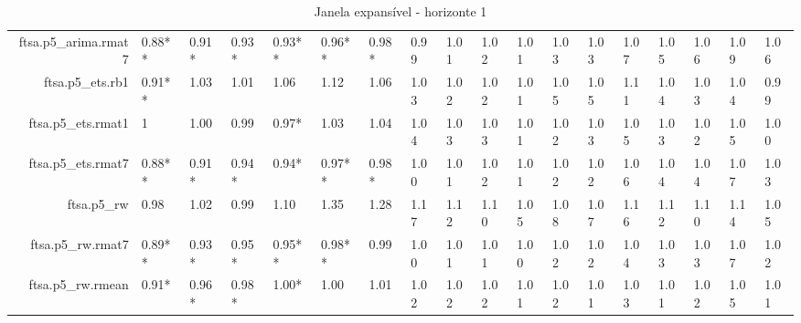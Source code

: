 \begin{table}[ht]
{\begin{tabular}{rlllllllllllllllll}
  ftsa.p5\_arima.rmat7 & 0.88** & 0.91* & 0.93* & 0.93** & 0.96** & 0.98* & 0.99 & 1.01 & 1.02 & 1.01 & 1.03 & 1.03 & 1.07 & 1.05 & 1.06 & 1.09 & 1.06 \\ 
  ftsa.p5\_ets.rb1 & 0.91** & 1.03 & 1.01 & 1.06 & 1.12 & 1.06 & 1.03 & 1.02 & 1.02 & 1.01 & 1.05 & 1.05 & 1.11 & 1.04 & 1.03 & 1.04 & 0.99 \\ 
  ftsa.p5\_ets.rmat1 & 1 & 1.00 & 0.99 & 0.97* & 1.03 & 1.04 & 1.04 & 1.03 & 1.03 & 1.01 & 1.02 & 1.03 & 1.05 & 1.03 & 1.02 & 1.05 & 1.00 \\ 
  ftsa.p5\_ets.rmat7 & 0.88** & 0.91* & 0.94* & 0.94* & 0.97** & 0.98* & 1.00 & 1.01 & 1.02 & 1.01 & 1.02 & 1.02 & 1.06 & 1.04 & 1.04 & 1.07 & 1.03 \\ 
  ftsa.p5\_rw & 0.98 & 1.02 & 0.99 & 1.10 & 1.35 & 1.28 & 1.17 & 1.12 & 1.10 & 1.05 & 1.08 & 1.07 & 1.16 & 1.12 & 1.10 & 1.14 & 1.05 \\ 
  ftsa.p5\_rw.rmat7 & 0.89** & 0.93* & 0.95* & 0.95** & 0.98** & 0.99 & 1.00 & 1.01 & 1.01 & 1.00 & 1.02 & 1.02 & 1.04 & 1.03 & 1.03 & 1.07 & 1.02 \\ 
  ftsa.p5\_rw.rmean & 0.91* & 0.96* & 0.98* & 1.00* & 1.00 & 1.01 & 1.02 & 1.02 & 1.02 & 1.01 & 1.02 & 1.01 & 1.03 & 1.01 & 1.02 & 1.05 & 1.01 \\ 
   \hline
\end{tabular}
}
\caption{Janela expansível - horizonte 1} 
\end{table}

